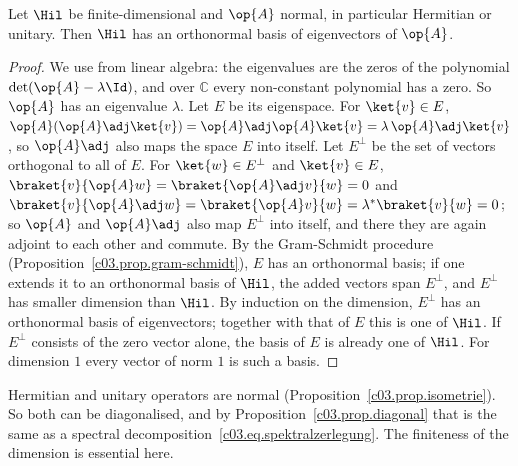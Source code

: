 \begin{theorem}\label{c03.thm.spektral}
  Let $\Hil$ be finite-dimensional and $\op{A}$ normal, in particular Hermitian or unitary. Then
  $\Hil$ has an orthonormal basis of eigenvectors of $\op{A}$.
\end{theorem}
\begin{proof}
  We use from linear algebra: the eigenvalues are the zeros of the polynomial
  $\det(\op{A} - \lambda\Id)$, and over $\mathbb{C}$ every non-constant polynomial has a zero. So
  $\op{A}$ has an eigenvalue $\lambda$. Let $E$ be its eigenspace. For $\ket{v} \in E$,
  $\op{A}(\op{A}\adj\ket{v}) = \op{A}\adj\op{A}\ket{v} = \lambda\,\op{A}\adj\ket{v}$,
  so $\op{A}\adj$ also maps the space $E$ into itself. Let $E^\perp$ be the set of vectors
  orthogonal to all of $E$. For $\ket{w} \in E^\perp$ and $\ket{v} \in E$,
  $\braket{v}{\op{A}w} = \braket{\op{A}\adj v}{w} = 0$ and
  $\braket{v}{\op{A}\adj w} = \braket{\op{A}v}{w} = \lambda^*\braket{v}{w} = 0$; so $\op{A}$ and
  $\op{A}\adj$ also map $E^\perp$ into itself, and there they are again adjoint to each other and
  commute. By the Gram-Schmidt procedure (Proposition~\ref{c03.prop.gram-schmidt}), $E$ has an
  orthonormal basis; if one extends it to an orthonormal basis of $\Hil$, the added vectors span
  $E^\perp$, and $E^\perp$ has smaller dimension than $\Hil$. By induction on the dimension,
  $E^\perp$ has an orthonormal basis of eigenvectors; together with that of $E$ this is one of
  $\Hil$. If $E^\perp$ consists of the zero vector alone, the basis of $E$ is already one of $\Hil$.
  For dimension $1$ every vector of norm $1$ is such a basis.
\end{proof}

Hermitian and unitary operators are normal (Proposition~\ref{c03.prop.isometrie}). So both can be
diagonalised, and by Proposition~\ref{c03.prop.diagonal} that is the same as a spectral
decomposition~\eqref{c03.eq.spektralzerlegung}. The finiteness of the dimension is
essential here.

